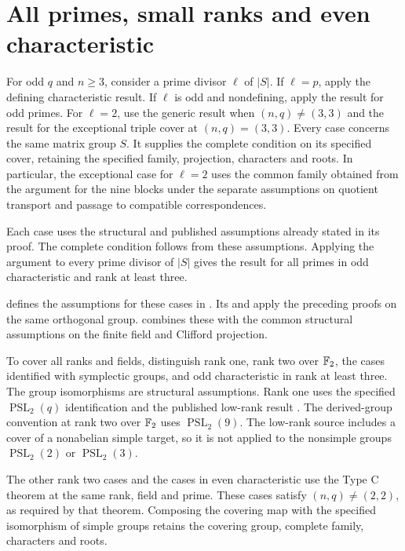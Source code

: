 \section{All primes, small ranks and even characteristic}

For odd $q$ and $n\geq3$, consider a prime divisor $\ell$ of $|S|$.
If $\ell=p$, apply the defining characteristic result. If $\ell$ is odd and nondefining,
apply the result for odd primes. For $\ell=2$, use the generic result when
$(n,q)\ne(3,3)$ and the result for the exceptional triple cover at
$(n,q)=(3,3)$. Every case concerns the same matrix group $S$.
It supplies the complete condition on its specified cover, retaining
the specified family, projection, characters and roots. In particular,
the exceptional case for $\ell=2$ uses the common family obtained from
the argument for the nine blocks under the separate assumptions on
quotient transport and passage to compatible correspondences.

Each case uses the structural and published assumptions already
stated in its proof. The complete condition follows from these assumptions.
Applying the argument to every prime divisor of $|S|$ gives the
result for all primes in odd characteristic and rank at least three.

\begin{implementation}
 defines the assumptions for these
cases in . Its  and
 apply the preceding proofs on the same
orthogonal group.  combines these
with the common structural assumptions on the finite field and
Clifford projection.
\end{implementation}

To cover all ranks and fields, distinguish rank one, rank two over $\mathbb F_2$,
the cases identified with symplectic groups, and odd characteristic in rank
at least three. The group isomorphisms are structural assumptions. Rank
one uses the specified $\operatorname{PSL}_2(q)$ identification and
the published low-rank result
\cite[Proposition~4.6]{FengLiZhang2023LowRankA}. The derived-group
convention at rank two over $\mathbb F_2$ uses
$\operatorname{PSL}_2(9)$. The low-rank source includes a cover of a
nonabelian simple target, so it is not applied to the nonsimple groups
$\operatorname{PSL}_2(2)$ or $\operatorname{PSL}_2(3)$.

The other rank two cases and the cases in even characteristic use
the Type C theorem at the same rank, field and prime. These cases satisfy
$(n,q)\ne(2,2)$, as required by that theorem.
Composing the covering map with the specified isomorphism of simple groups
retains the covering group, complete family,
characters and roots.

